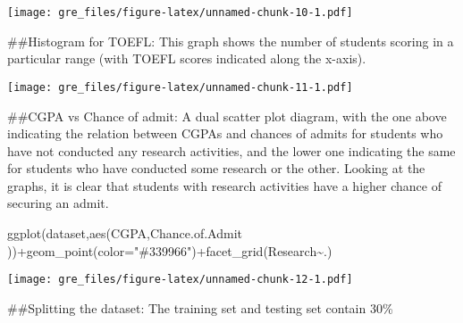 \documentclass[
]{article}
\newenvironment{Shaded}{\begin{snugshade}}{\end{snugshade}}
\newcommand{\AttributeTok}[1]{\textcolor[rgb]{0.77,0.63,0.00}{#1}}
\newcommand{\CommentTok}[1]{\textcolor[rgb]{0.56,0.35,0.01}{\textit{#1}}}
\newcommand{\ConstantTok}[1]{\textcolor[rgb]{0.00,0.00,0.00}{#1}}
\newcommand{\DecValTok}[1]{\textcolor[rgb]{0.00,0.00,0.81}{#1}}
\newcommand{\FloatTok}[1]{\textcolor[rgb]{0.00,0.00,0.81}{#1}}
\newcommand{\FunctionTok}[1]{\textcolor[rgb]{0.00,0.00,0.00}{#1}}
\newcommand{\NormalTok}[1]{#1}
\newcommand{\OtherTok}[1]{\textcolor[rgb]{0.56,0.35,0.01}{#1}}
\newcommand{\SpecialCharTok}[1]{\textcolor[rgb]{0.00,0.00,0.00}{#1}}
\newcommand{\StringTok}[1]{\textcolor[rgb]{0.31,0.60,0.02}{#1}}
\begin{document}
\texttt{[image: gre\_files/figure-latex/unnamed-chunk-10-1.pdf]}

\#\#Histogram for TOEFL: This graph shows the number of students scoring
in a particular range (with TOEFL scores indicated along the x-axis).

\begin{Shaded}
\end{Shaded}

\texttt{[image: gre\_files/figure-latex/unnamed-chunk-11-1.pdf]}

\#\#CGPA vs Chance of admit: A dual scatter plot diagram, with the one
above indicating the relation between CGPAs and chances of admits for
students who have not conducted any research activities, and the lower
one indicating the same for students who have conducted some research or
the other. Looking at the graphs, it is clear that students with
research activities have a higher chance of securing an admit.

\begin{Shaded}
\begin{Highlighting}[]
\FunctionTok{ggplot}\NormalTok{(dataset,}\FunctionTok{aes}\NormalTok{(CGPA,Chance.of.Admit ))}\SpecialCharTok{+}\FunctionTok{geom\_point}\NormalTok{(}\AttributeTok{color=}\StringTok{"\#339966"}\NormalTok{)}\SpecialCharTok{+}\FunctionTok{facet\_grid}\NormalTok{(Research}\SpecialCharTok{\textasciitilde{}}\NormalTok{.)}
\end{Highlighting}
\end{Shaded}

\texttt{[image: gre\_files/figure-latex/unnamed-chunk-12-1.pdf]}

\#\#Splitting the dataset: The training set and testing set contain 30\%

\begin{Shaded}
\end{Shaded}
\end{document}
